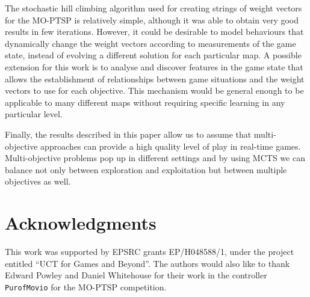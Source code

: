 \documentclass[journal]{IEEEtran}
\begin{document}
The stochastic hill climbing algorithm used for creating strings of weight vectors for the MO-PTSP is relatively simple, although it was able to obtain very good results in few iterations. However, it could be desirable to model behaviours that dynamically change the weight vectors according to measurements of the game state, instead of evolving a different solution for each particular map. A possible extension for this work is to analyse and discover features in the game state that allows the establishment of relationships between game situations and the weight vectors to use for each objective. This mechanism would be general enough to be applicable to many different maps without requiring specific learning in any particular level.

Finally, the results described in this paper allow us to assume that multi-objective approaches can provide a high quality level of play in real-time games. Multi-objective problems pop up in different settings and by using MCTS we can balance not only between exploration and exploitation but between multiple objectives as well. 

\section*{Acknowledgments}
This work was supported by EPSRC grants EP/H048588/1, under the project entitled ``UCT for Games and Beyond''. The authors would also like to thank Edward Powley and Daniel Whitehouse for their work in the controller \texttt{PurofMovio} for the MO-PTSP competition.


\ifCLASSOPTIONcaptionsoff
  \newpage
\fi





%
%
%
\end{document}

